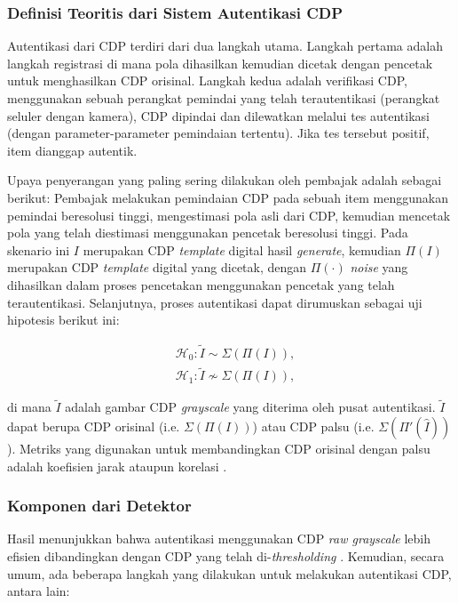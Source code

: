 \subsubsection{Definisi Teoritis dari Sistem Autentikasi CDP}
Autentikasi dari CDP terdiri dari dua langkah utama. Langkah pertama adalah langkah registrasi di mana pola dihasilkan kemudian dicetak dengan pencetak untuk
menghasilkan CDP orisinal. Langkah kedua adalah verifikasi CDP, menggunakan sebuah perangkat pemindai yang telah terautentikasi (perangkat seluler dengan
kamera), CDP dipindai dan dilewatkan melalui tes autentikasi (dengan parameter-parameter pemindaian tertentu). Jika tes tersebut positif, item dianggap
autentik.

Upaya penyerangan yang paling sering dilakukan oleh pembajak adalah sebagai berikut: Pembajak melakukan pemindaian CDP pada sebuah item menggunakan pemindai
beresolusi tinggi, mengestimasi pola asli dari CDP, kemudian mencetak pola yang telah diestimasi menggunakan pencetak beresolusi tinggi. Pada skenario ini $I$
merupakan CDP \emph{template} digital hasil \emph{generate}, kemudian $\Pi(I)$ merupakan CDP \emph{template} digital yang dicetak, dengan $\Pi(\cdot)$
\emph{noise} yang dihasilkan dalam proses pencetakan menggunakan pencetak yang telah terautentikasi. Selanjutnya, proses autentikasi dapat dirumuskan sebagai
uji hipotesis berikut ini:

\begin{align}
	 & \mathcal{H}_{0}:\tilde{I}\sim\Sigma(\Pi(I)), \\ &\mathcal{H}_{1}:\tilde{I}\not\sim\Sigma(\Pi(I)),\nonumber
\end{align}

\noindent di mana $\widetilde{I}$ adalah gambar CDP \emph{grayscale} yang diterima oleh pusat autentikasi. $\widetilde{I}$ dapat berupa CDP orisinal (i.e. $\Sigma(\Pi(I))$) atau CDP palsu (i.e. $\Sigma(\Pi'(\hat{I}))$). Metriks yang digunakan untuk membandingkan CDP orisinal dengan palsu adalah koefisien jarak ataupun korelasi \cite{dirik2012copy}.

\subsubsection{Komponen dari Detektor}
Hasil menunjukkan bahwa autentikasi menggunakan CDP \emph{raw grayscale} lebih efisien dibandingkan dengan CDP yang telah di-\emph{thresholding}
\cite{phan2014document}. Kemudian, secara umum, ada beberapa langkah yang dilakukan untuk melakukan autentikasi CDP, antara lain:

